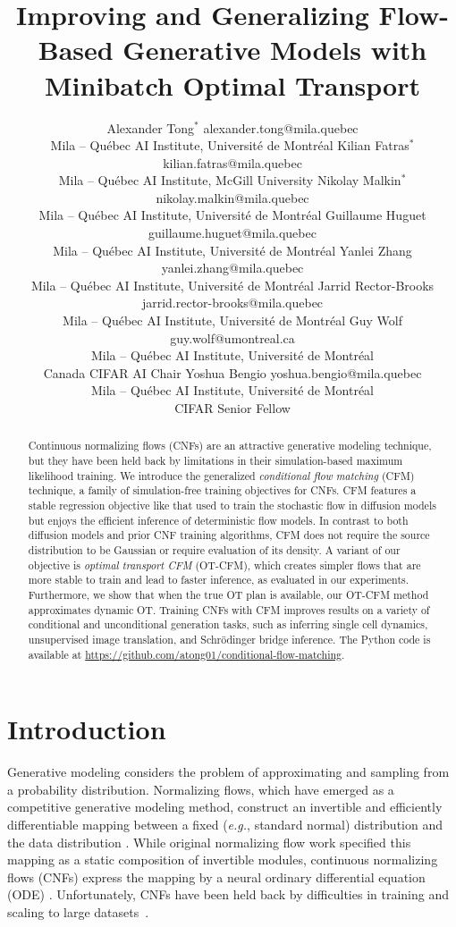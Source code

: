 \documentclass[10pt]{article}
\title{Improving and Generalizing Flow-Based Generative Models with Minibatch Optimal Transport}
\author{\name Alexander Tong$^*$ \email alexander.tong@mila.quebec\\
    \addr Mila -- Qu\'ebec AI Institute, Universit\'e de Montr\'eal 
    \AND
    \name Kilian Fatras$^*$ \email kilian.fatras@mila.quebec \\
    \addr Mila -- Qu\'ebec AI Institute, McGill University
    \AND
    \name Nikolay Malkin$^*$ \email nikolay.malkin@mila.quebec\\
    \addr Mila -- Qu\'ebec AI Institute, Universit\'e de Montr\'eal 
    \AND
    \name Guillaume Huguet \email guillaume.huguet@mila.quebec\\
    \addr Mila -- Qu\'ebec AI Institute, Universit\'e de Montr\'eal 
    \AND
    \name Yanlei Zhang \email yanlei.zhang@mila.quebec\\
    \addr Mila -- Qu\'ebec AI Institute, Universit\'e de Montr\'eal 
    \AND
    \name Jarrid Rector-Brooks \email jarrid.rector-brooks@mila.quebec \\
    \addr Mila -- Qu\'ebec AI Institute, Universit\'e de Montr\'eal  
    \AND
    \name Guy Wolf \email guy.wolf@umontreal.ca \\
    \addr Mila -- Qu\'ebec AI Institute, Universit\'e de Montr\'eal\\
    Canada CIFAR AI Chair
    \AND
    \name Yoshua Bengio \email yoshua.bengio@mila.quebec \\
    \addr Mila -- Qu\'ebec AI Institute, Universit\'e de Montr\'eal \\ CIFAR Senior Fellow
}
\theoremstyle{plain}
\theoremstyle{definition}
\theoremstyle{remark}
\newcommand{\eg}{\textit{e.g.}}
\begin{document}
\maketitle

\begin{abstract}
Continuous normalizing flows (CNFs) are an attractive generative modeling technique, but they have been held back by limitations in their simulation-based maximum likelihood training. We introduce the generalized \textit{conditional flow matching} (CFM) technique, a family of simulation-free training objectives for CNFs. CFM features a stable regression objective like that used to train the stochastic flow in diffusion models but enjoys the efficient inference of deterministic flow models. In contrast to both diffusion models and prior CNF training algorithms, CFM does not require the source distribution to be Gaussian or require evaluation of its density. A variant of our objective is \textit{optimal transport CFM} (OT-CFM), which creates simpler flows that are more stable to train and lead to faster inference, as evaluated in our experiments. {Furthermore, we show that when the true OT plan is available, our OT-CFM method approximates dynamic OT}. Training CNFs with CFM improves results on a variety of conditional and unconditional generation tasks, such as inferring single cell dynamics, unsupervised image translation, and Schr\"odinger bridge inference. The Python code is available at \url{https://github.com/atong01/conditional-flow-matching}.
\end{abstract}

\def\thefootnote{*}\def\thefootnote{\arabic{footnote}}


\section{Introduction}

Generative modeling considers the problem of approximating and sampling from a probability distribution. Normalizing flows, which have emerged as a competitive generative modeling method, construct an invertible and efficiently differentiable mapping between a fixed (\eg, standard normal) distribution and the data distribution \citep{rezende_variational_2015}. While original normalizing flow work specified this mapping as a static composition of invertible modules, continuous normalizing flows (CNFs) express the mapping by a neural ordinary differential equation (ODE) \citep{chen_neural_2018}. Unfortunately, CNFs have been held back by difficulties in training and scaling to large datasets~\citep{chen_neural_2018,grathwohl_ffjord:_2019,onken_ot-flow_2021}.
\end{document}

